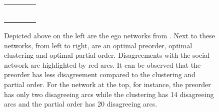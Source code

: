 \begin{figure}
    \centering
    \small
    \setlength{\tabcolsep}{0pt}
    \begin{tabular}{@{}cccc@{}}    
         &
         &
         &
         
        \\
         &
         &
         &
         
        \\
         &
         &
         &
         
        \\
         &
         &
         &
         
        \\
         &
         &
         &
         
        \\
         &
         &
         &
         \\
    \end{tabular}
    \caption{Depicted above on the left are the ego networks from  . 
    Next to these networks, from left to right, are an optimal preorder, optimal clustering and optimal partial order.
    Disagreements with the social network are highlighted by red arcs.
    It can be observed that the preorder has less disagreement compared to the clustering and partial order.
    For the network at the top, for instance, the preorder has only two disagreeing arcs while the clustering has 14 disagreeing arcs and the partial order has 20 disagreeing arcs.}
    \label{fig:clustering-vs-ordering}
\end{figure}

